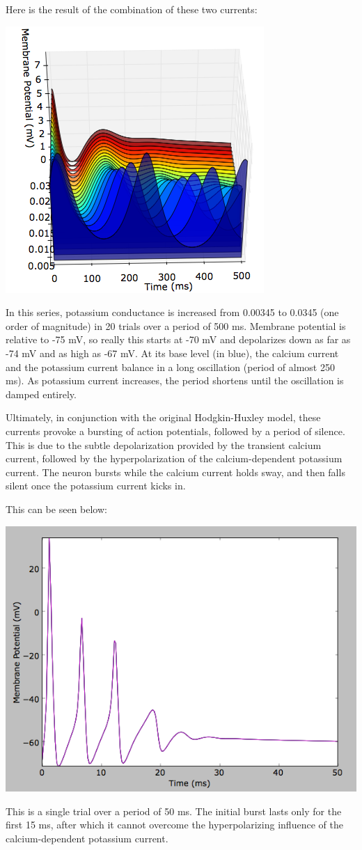 \documentclass[12pt]{article}
\begin{document}
Here is the result of the combination of these two currents:

\includegraphics[scale=0.8]{kca.png}

In this series, potassium conductance is increased from 0.00345 to 0.0345 (one order of magnitude) in 20 trials over a period of 500 ms.  Membrane potential is relative to -75 mV, so really this starts at -70 mV and depolarizes down as far as -74 mV and as high as -67 mV.  At its base level (in blue), the calcium current and the potassium current balance in a long oscillation (period of almost 250 ms).  As potassium current increases, the period shortens until the oscillation is damped entirely.  

Ultimately, in conjunction with the original Hodgkin-Huxley model, these currents provoke a bursting of action potentials, followed by a period of silence.  This is due to the subtle depolarization provided by the transient calcium current, followed by the hyperpolarization of the calcium-dependent potassium current.  The neuron bursts while the calcium current holds sway, and then falls silent once the potassium current kicks in.  

This can be seen below:

\includegraphics[scale=0.6]{burst.png}

This is a single trial over a period of 50 ms.  The initial burst lasts only for the first 15 ms, after which it cannot overcome the hyperpolarizing influence of the calcium-dependent potassium current.
\end{document}
